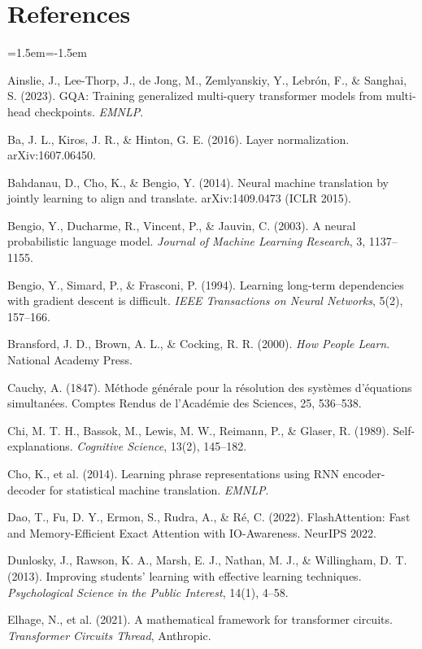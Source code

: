 \section*{References}
\begin{list}{}{\leftmargin=1.5em\itemindent=-1.5em\itemsep=2pt\small}
\item Ainslie, J., Lee-Thorp, J., de Jong, M., Zemlyanskiy, Y., Lebr\'on, F., \& Sanghai, S. (2023). GQA: Training generalized multi-query transformer models from multi-head checkpoints. \emph{EMNLP}.
\item Ba, J. L., Kiros, J. R., \& Hinton, G. E. (2016). Layer normalization. arXiv:1607.06450.
\item Bahdanau, D., Cho, K., \& Bengio, Y. (2014). Neural machine translation by jointly learning to align and translate. arXiv:1409.0473 (ICLR 2015).
\item Bengio, Y., Ducharme, R., Vincent, P., \& Jauvin, C. (2003). A neural probabilistic language model. \emph{Journal of Machine Learning Research}, 3, 1137--1155.
\item Bengio, Y., Simard, P., \& Frasconi, P. (1994). Learning long-term dependencies with gradient descent is difficult. \emph{IEEE Transactions on Neural Networks}, 5(2), 157--166.
\item Bransford, J. D., Brown, A. L., \& Cocking, R. R. (2000). \emph{How People Learn}. National Academy Press.
\item Cauchy, A. (1847). M\'ethode g\'en\'erale pour la r\'esolution des syst\`emes d'\'equations simultan\'ees. Comptes Rendus de l'Acad\'emie des Sciences, 25, 536--538.
\item Chi, M. T. H., Bassok, M., Lewis, M. W., Reimann, P., \& Glaser, R. (1989). Self-explanations. \emph{Cognitive Science}, 13(2), 145--182.
\item Cho, K., et al. (2014). Learning phrase representations using RNN encoder-decoder for statistical machine translation. \emph{EMNLP}.
\item Dao, T., Fu, D. Y., Ermon, S., Rudra, A., \& R\'e, C. (2022). FlashAttention: Fast and Memory-Efficient Exact Attention with IO-Awareness. NeurIPS 2022.
\item Dunlosky, J., Rawson, K. A., Marsh, E. J., Nathan, M. J., \& Willingham, D. T. (2013). Improving students' learning with effective learning techniques. \emph{Psychological Science in the Public Interest}, 14(1), 4--58.
\item Elhage, N., et al. (2021). A mathematical framework for transformer circuits. \emph{Transformer Circuits Thread}, Anthropic.

\end{list}
